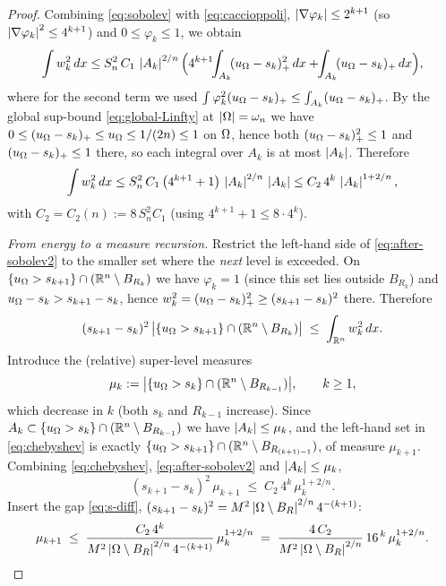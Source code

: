 \begin{proof}
Combining \eqref{eq:sobolev} with \eqref{eq:caccioppoli},
$\left|\nabla\varphi_k\right|\le2^{k+1}$ (so $\left|\nabla\varphi_k\right|^2\le4^{k+1}$)
and $0\le\varphi_k\le1$, we obtain
\begin{equation}\label{eq:after-sobolev}
   \int w_k^2\,dx
   \le S_n^2\,C_1\,\left|A_k\right|^{2/n}
   \Bigl(4^{k+1}\!\!\int_{A_k}\!(u_\Omega-s_k)_+^2\,dx
        +\!\!\int_{A_k}\!(u_\Omega-s_k)_+\,dx\Bigr),
\end{equation}
where for the second term we used
$\int\varphi_k^2(u_\Omega-s_k)_+\le\int_{A_k}(u_\Omega-s_k)_+$. By the global
sup-bound \eqref{eq:global-Linfty} at $\left|\Omega\right|=\omega_n$ we have
$0\le(u_\Omega-s_k)_+\le u_\Omega\le1/(2n)\le1$ on $\Omega$, hence both
$(u_\Omega-s_k)_+^2\le1$ and $(u_\Omega-s_k)_+\le1$ there, so each integral over
$A_k$ is at most $\left|A_k\right|$. Therefore
\begin{equation}\label{eq:after-sobolev2}
   \int w_k^2\,dx
   \le S_n^2\,C_1\,\bigl(4^{k+1}+1\bigr)\,\left|A_k\right|^{2/n}\,\left|A_k\right|
   \le C_2\,4^{k}\,\left|A_k\right|^{1+2/n},
\end{equation}
with $C_2=C_2(n):=8\,S_n^2 C_1$ (using $4^{k+1}+1\le8\cdot4^{k}$).

\smallskip
\emph{From energy to a measure recursion.} Restrict the left-hand side of
\eqref{eq:after-sobolev2} to the smaller set where the \emph{next} level
is exceeded. On $\{u_\Omega>s_{k+1}\}\cap(\mathbb{R}^n\setminus B_{R_{k}})$ we have
$\varphi_k=1$ (since this set lies outside $B_{R_k}$) and
$u_\Omega-s_k>s_{k+1}-s_k$, hence
$w_k^2=(u_\Omega-s_k)_+^2\ge(s_{k+1}-s_k)^2$ there. Therefore
\begin{equation}\label{eq:chebyshev}
   (s_{k+1}-s_k)^2\,
   \bigl|\{u_\Omega>s_{k+1}\}\cap(\mathbb{R}^n\setminus B_{R_{k}})\bigr|
   \;\le\;\int_{\mathbb{R}^n}w_k^2\,dx .
\end{equation}
Introduce the (relative) super-level measures
\[
   \mu_k:=\bigl|\{u_\Omega>s_k\}\cap(\mathbb{R}^n\setminus B_{R_{k-1}})\bigr|,
   \qquad k\ge1,
\]
which decrease in $k$ (both $s_k$ and $R_{k-1}$ increase). Since
$A_k\subset\{u_\Omega>s_k\}\cap(\mathbb{R}^n\setminus B_{R_{k-1}})$ we have
$\left|A_k\right|\le\mu_k$, and the left-hand set in \eqref{eq:chebyshev} is
exactly $\{u_\Omega>s_{k+1}\}\cap(\mathbb{R}^n\setminus B_{R_{(k+1)-1}})$, of
measure $\mu_{k+1}$. Combining \eqref{eq:chebyshev},
\eqref{eq:after-sobolev2} and $\left|A_k\right|\le\mu_k$,
\[
   (s_{k+1}-s_k)^2\,\mu_{k+1}
   \;\le\;C_2\,4^{k}\,\mu_k^{1+2/n}.
\]
Insert the gap \eqref{eq:s-diff},
$(s_{k+1}-s_k)^2=M^2\left|\Omega\setminus B_R\right|^{2/n}4^{-(k+1)}$:
\begin{equation}\label{eq:mu-recursion}
   \mu_{k+1}\;\le\;
   \frac{C_2\,4^{k}}{M^2\left|\Omega\setminus B_R\right|^{2/n}4^{-(k+1)}}\,
   \mu_k^{1+2/n}
   \;=\;\frac{4\,C_2}{M^2\left|\Omega\setminus B_R\right|^{2/n}}\,16^{\,k}\,
   \mu_k^{1+2/n}.
\end{equation}


\end{proof}
